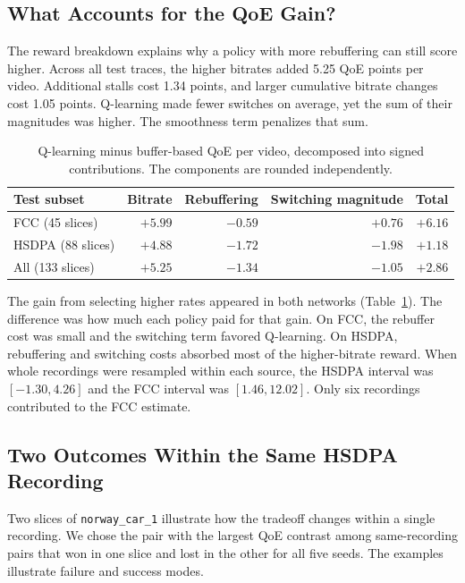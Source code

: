 \documentclass[10pt,letterpaper]{article}
\begin{document}
\subsection{What Accounts for the QoE Gain?}

The reward breakdown explains why a policy with more rebuffering can still
score higher. Across all test traces, the higher bitrates added 5.25 QoE
points per video. Additional stalls cost 1.34 points, and larger cumulative
bitrate changes cost 1.05 points. Q-learning made fewer switches on average,
yet the sum of their magnitudes was higher. The smoothness term penalizes
that sum.

\begin{table}[htbp]
\centering
\small
\caption{Q-learning minus buffer-based QoE per video, decomposed into
signed contributions. The components are rounded independently.}
\label{tab:decomposition}
\begin{tabular}{lrrrr}
\toprule
Test subset & Bitrate & Rebuffering & Switching magnitude & Total \\
\midrule
FCC (45 slices) & \(+5.99\) & \(-0.59\) & \(+0.76\) & \(+6.16\) \\
HSDPA (88 slices) & \(+4.88\) & \(-1.72\) & \(-1.98\) & \(+1.18\) \\
All (133 slices) & \(+5.25\) & \(-1.34\) & \(-1.05\) & \(+2.86\) \\
\bottomrule
\end{tabular}
\end{table}

The gain from selecting higher rates appeared in both networks
(Table~\ref{tab:decomposition}). The difference was how much each policy paid
for that gain. On FCC, the rebuffer cost was small and the switching term
favored Q-learning. On HSDPA, rebuffering and switching costs absorbed most
of the higher-bitrate reward. When whole recordings were resampled within each source, the HSDPA interval
was $[-1.30, 4.26]$ and the FCC interval was $[1.46, 12.02]$. Only six
recordings contributed to the FCC estimate.

\subsection{Two Outcomes Within the Same HSDPA Recording}

Two slices of \texttt{norway\_car\_1} illustrate how the tradeoff changes
within a single recording. We chose the pair with the largest QoE contrast
among same-recording pairs that won in one slice and lost in the other for
all five seeds. The examples illustrate failure and success modes.
\end{document}
